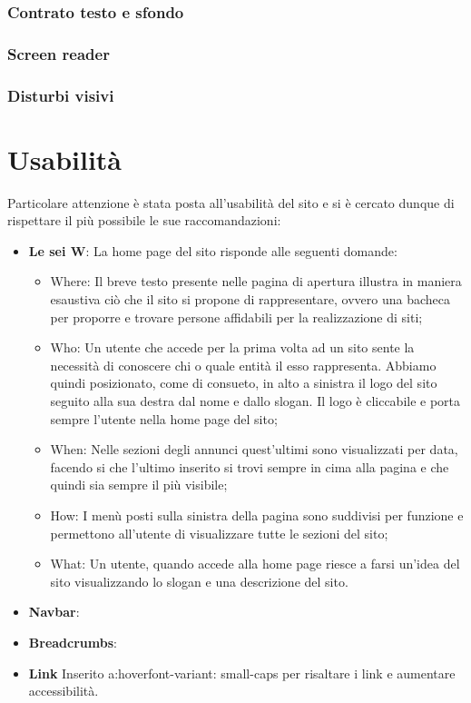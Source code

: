 \documentclass[12pt]{article}
\begin{document}
		\subsubsection{Contrato testo e sfondo}
		\subsubsection{Screen reader}		
		\subsubsection{Disturbi visivi}
		
\section{Usabilità}
Particolare attenzione è stata posta all’usabilità del sito e si è cercato dunque di rispettare il più possibile le sue raccomandazioni:

\begin{itemize}
\item \textbf{Le sei W}: La home page del sito risponde alle seguenti domande:

\begin{itemize}
\item Where: Il breve testo presente nelle pagina di apertura illustra in maniera esaustiva ciò che il sito si propone di rappresentare, ovvero una bacheca per proporre e trovare persone affidabili per la realizzazione di siti;
\item Who: Un utente che accede per la prima volta ad un sito sente la necessità di conoscere chi o quale entità il esso rappresenta. Abbiamo quindi posizionato, come di consueto, in alto a sinistra il logo del sito seguito alla sua destra dal nome e dallo slogan. Il logo è cliccabile e porta sempre l'utente nella home page del sito;
\item When: Nelle sezioni degli annunci quest'ultimi sono visualizzati per data, facendo si che l'ultimo inserito si trovi sempre in cima alla pagina e che quindi sia sempre il più visibile;
\item How: I menù posti sulla sinistra della pagina sono suddivisi per funzione e permettono all'utente di visualizzare tutte le sezioni del sito;
\item What: Un utente, quando accede alla home page riesce a farsi un’idea del sito visualizzando lo slogan e una descrizione del sito.
\end{itemize}

\item \textbf{Navbar}:

\item \textbf{Breadcrumbs}:

\item \textbf{Link}
Inserito a:hover{font-variant: small-caps} per risaltare i link e aumentare accessibilità.


\end{itemize}
\end{document}
